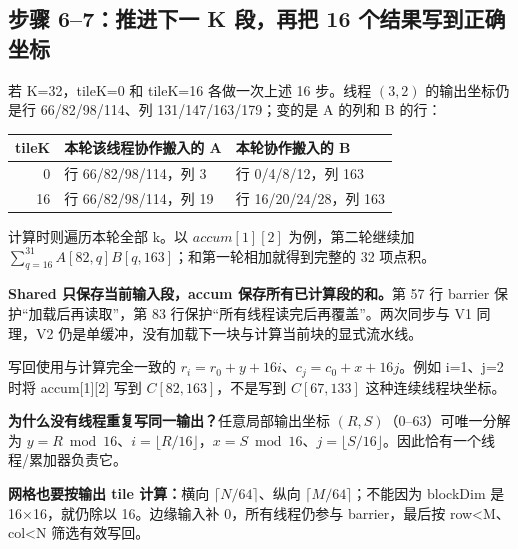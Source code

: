 \pagebreakhere

\subsection{步骤 6--7：推进下一 K 段，再把 16 个结果写到正确坐标}
若 K=32，tileK=0 和 tileK=16 各做一次上述 16 步。线程 $(3,2)$ 的输出坐标仍是行 66/82/98/114、列 131/147/163/179；变的是 A 的列和 B 的行：
\begin{table}[H]\centering\small
\begin{tabular}{rll}
\toprule
tileK & 本轮该线程协作搬入的 A & 本轮协作搬入的 B\\\midrule
0 & 行 66/82/98/114，列 3 & 行 0/4/8/12，列 163\\
16 & 行 66/82/98/114，列 19 & 行 16/20/24/28，列 163\\\bottomrule
\end{tabular}
\end{table}
计算时则遍历本轮全部 k。以 $accum[1][2]$ 为例，第二轮继续加 $\sum_{q=16}^{31}A[82,q]B[q,163]$；和第一轮相加就得到完整的 32 项点积。

\textbf{Shared 只保存当前输入段，accum 保存所有已计算段的和。}第 57 行 barrier 保护“加载后再读取”，第 83 行保护“所有线程读完后再覆盖”。两次同步与 V1 同理，V2 仍是单缓冲，没有加载下一块与计算当前块的显式流水线。


写回使用与计算完全一致的 $r_i=r_0+y+16i$、$c_j=c_0+x+16j$。例如 i=1、j=2 时将 accum[1][2] 写到 $C[82,163]$，不是写到 $C[67,133]$ 这种连续线程块坐标。

\textbf{为什么没有线程重复写同一输出？}任意局部输出坐标 $(R,S)$（0--63）可唯一分解为 $y=R\bmod16$、$i=\lfloor R/16\rfloor$，$x=S\bmod16$、$j=\lfloor S/16\rfloor$。因此恰有一个线程/累加器负责它。

\textbf{网格也要按输出 tile 计算：}横向 $\lceil N/64\rceil$、纵向 $\lceil M/64\rceil$；不能因为 blockDim 是 16×16，就仍除以 16。边缘输入补 0，所有线程仍参与 barrier，最后按 row<M、col<N 筛选有效写回。
\pagebreakhere

